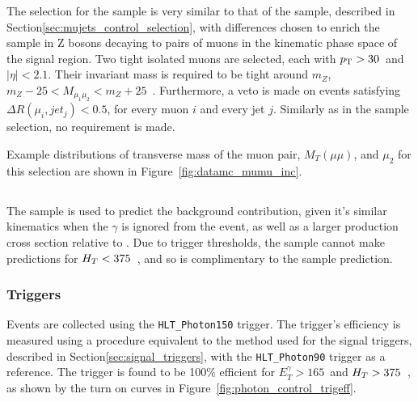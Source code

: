 The selection for the \mmj sample is very similar to that of the \mj sample, 
described in Section\ref{sec:mujets_control_selection}, with differences chosen
to enrich the sample in Z bosons decaying to pairs of muons in the kinematic 
phase space of the signal region. Two tight isolated muons are selected, each 
with ${p_{\text T}} > 30$~\gev and $|\eta| < 2.1$. Their invariant mass is required to be
tight around $m_Z$, $m_Z - 25 < M_{\mu_1\mu_2} < m_Z + 25$~\gev. Furthermore, a 
veto is made on events satisfying $\Delta R(\mu_i, jet_j) < 0.5$, for every muon 
$i$ and every jet $j$. Similarly as in the \mj sample selection, no \alphat
requirement is made.

Example distributions of transverse mass of the muon pair, $M_T(\mu\mu)$, and
$\mu_2$ \Pt for this selection are shown in Figure~\ref{fig:datamc_mumu_inc}.

\subsection{\gj}
\label{sec:gjets_control_sample}
The \gj sample is used to predict the \zinv background contribution, given it's 
similar kinematics when the $\gamma$ is ignored from the event, as well as a
larger
production cross section relative to \mmj. Due to trigger thresholds, the \gj
sample cannot make predictions for $H_T<375$~\gev, and so is complimentary to
the \mmj sample prediction.

\subsubsection{Triggers}
Events are collected using the \verb!HLT_Photon150! trigger. The trigger's 
efficiency is measured using
a procedure equivalent to the method used for the signal triggers, described in
Section\ref{sec:signal_triggers}, with the \verb!HLT_Photon90! trigger as a reference.
The trigger
is found to be 100$\%$ efficient for $E_T^{\gamma}>165$~\gev and $H_T>375$~\gev,
as shown by the turn on curves in Figure~\ref{fig:photon_control_trigeff}.

